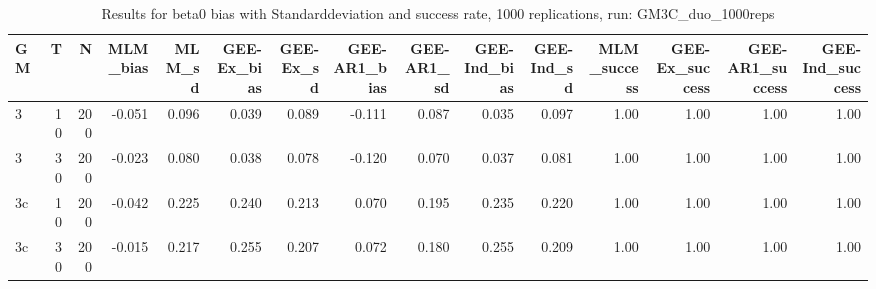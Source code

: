 \begin{table}[ht]
\centering
\begin{tabular}{lrrrrrrrrrrrrrr}
  \hline
GM & T & N & MLM\_bias & MLM\_sd & GEE-Ex\_bias & GEE-Ex\_sd & GEE-AR1\_bias & GEE-AR1\_sd & GEE-Ind\_bias & GEE-Ind\_sd & MLM\_success & GEE-Ex\_success & GEE-AR1\_success & GEE-Ind\_success \\ 
  \hline
3 & 10 & 200 & -0.051 & 0.096 & 0.039 & 0.089 & -0.111 & 0.087 & 0.035 & 0.097 & 1.00 & 1.00 & 1.00 & 1.00 \\ 
  3 & 30 & 200 & -0.023 & 0.080 & 0.038 & 0.078 & -0.120 & 0.070 & 0.037 & 0.081 & 1.00 & 1.00 & 1.00 & 1.00 \\ 
  3c & 10 & 200 & -0.042 & 0.225 & 0.240 & 0.213 & 0.070 & 0.195 & 0.235 & 0.220 & 1.00 & 1.00 & 1.00 & 1.00 \\ 
  3c & 30 & 200 & -0.015 & 0.217 & 0.255 & 0.207 & 0.072 & 0.180 & 0.255 & 0.209 & 1.00 & 1.00 & 1.00 & 1.00 \\ 
   \hline
\end{tabular}
\caption{Results for beta0 bias with Standarddeviation and success rate, 1000 replications, run: GM3C_duo_1000reps} 
\label{tab:beta0_bias_sd_success}
\end{table}
